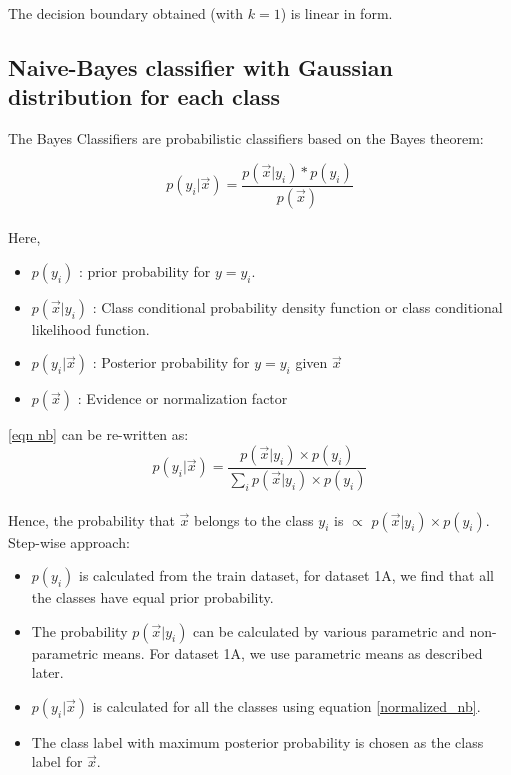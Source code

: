 \documentclass[11pt,a4paper]{article}
\newcommand{\noi}{\noindent}
\begin{document}
The decision boundary obtained (with $k=1$) is linear in form. 

\break
\subsection{Naive-Bayes classifier with Gaussian distribution for each class}
The Bayes Classifiers are probabilistic classifiers based on the Bayes theorem:

\begin{equation}
\label{eqn nb}
    p(y_{i}|\vec{x})=\frac{p(\vec{x}|y_{i})*p(y_{i})}{p(\vec{x})}
\end{equation}\\

\noi
Here,
\begin{itemize}
    \itemsep0em
    \item $p(y_{i})$ : prior probability for $y=y_{i}$.
    \item $p(\vec{x}|y_{i})$ : Class conditional probability density function or class conditional likelihood function.
    \item $p(y_{i}|\vec{x})$ : Posterior probability for $y=y_{i}$ given $\vec{x}$
    \item $p(\vec{x})$ : Evidence or normalization factor
\end{itemize}

\noi
\autoref{eqn nb} can be re-written as:
\begin{equation} \label{normalized_nb}
    p(y_{i}|\vec{x})=\frac{p(\vec{x}|y_{i}) \times p(y_{i})}{\sum_{i}p(\vec{x}|y_{i}) \times p(y_{i})}
\end{equation}\\

\noi
Hence, the probability that $\vec{x}$ belongs to the class $y_{i}$ is $\propto$ $p(\vec{x}|y_{i}) \times p(y_{i})$.\\

\noi
Step-wise approach:
\begin{itemize}
    \itemsep0em
    \item $p(y_{i})$ is calculated from the train dataset, for dataset 1A, we find that all the classes have equal prior probability.
    \item The probability $p(\vec{x}|y_{i})$ can be calculated by various parametric and non-parametric means. For dataset 1A, we use parametric means as described later.
    \item $p(y_{i}|\vec{x})$ is calculated for all the classes using equation \autoref{normalized_nb}.
    \item The class label with maximum posterior probability is chosen as the class label for $\vec{x}$.
\end{itemize}
\end{document}
